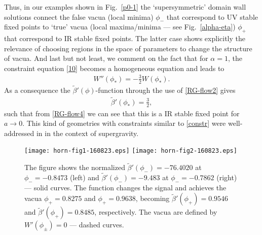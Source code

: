\documentclass[aps,12pt, a4paper,nofootinbib]{revtex4}
\begin{document}
{Thus, in our examples shown in Fig.~\ref{p0-1} the `supersymmetric' domain wall solutions connect the false vacua (local minima) $\phi_-$ that correspond to UV stable fixed points to `true' vacua (local maxima/minima --- see Fig.~\ref{alpha-eta}) $\phi_+$  that correspond to IR stable fixed points. The latter case shows explicitly the relevance of choosing regions in the space of parameters to change the structure of vacua. And last but not least, we comment on the fact that for $\alpha=1$, the constraint equation \eqref{10} becomes a homogeneous equation and leads to
\begin{eqnarray}\label{constr}
W''(\phi_*)=-\frac32 W(\phi_*).
\end{eqnarray}
As a consequence the  $\tilde{\beta}'(\phi)$-function through the use of \eqref{RG-flow2} gives
\begin{eqnarray}
\tilde{\beta}'(\phi_*)=\frac32,
\end{eqnarray}
such that from \eqref{RG-flow4} we can see that this is a IR stable fixed point for $a\to0$. This kind of geometries with constraints similar to \eqref{constr} were well-addressed in \cite{Kallosh:2000tj} in the context of supergravity.


\begin{figure}[!ht]
\begin{center}
\texttt{[image: horn-fig1-160823.eps]}\qquad\qquad\qquad
\texttt{[image: horn-fig2-160823.eps]}
\caption{The figure shows the normalized $\tilde{\beta}'(\phi_-)=-76.4020$ at $\phi_-=-0.8473$ (left) and $\tilde{\beta}'(\phi_-)=-9.483$ at $\phi_-=-0.7862$ (right) --- solid curves. The function changes the signal and achieves the vacua $\phi_+=0.8275$ and $\phi_+=0.9638$, becoming $\tilde{\beta}'(\phi_+)=0.9546$ and $\tilde{\beta}'(\phi_+)=0.8485$, respectively. The vacua are defined by $W'(\phi_\pm)=0$ --- dashed curves.}
\label{RG-flow-figs}
\end{center}
\end{figure}

}
\end{document}
